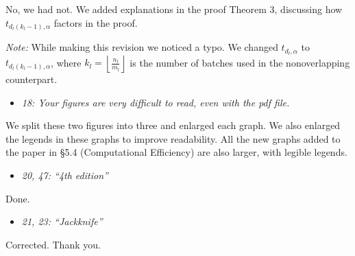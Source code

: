 \documentclass[11pt,notitlepage,onecolumn]{article}
\newcommand{\noi}{\noindent}
\begin{document}
\noi
No, we had not.   
We added explanations in the proof Theorem 3, discussing how $t_{d_l(k_l - 1),\alpha}$ factors in the proof. 
\medskip 

\noi 
{\it Note:}
While making this revision we noticed a typo. 
We changed $t_{d_l,\alpha}$ to $t_{d_l(k_l - 1),\alpha}$, where $k_l=\left\lfloor \frac{n_l}{m_l} \right\rfloor$ is the number of batches used in the nonoverlapping counterpart. 
\medskip 

\newpage
\begin{itemize}
\item[] \textit{18: Your figures are very difficult to read, even with the pdf file.}
\end{itemize}

\noi
We split these two figures into three and enlarged each graph. 
We also enlarged the legends in these graphs to improve readability.
All the new graphs added to the paper in \S 5.4 (Computational Efficiency) are also larger, with legible legends. 
\medskip 



\begin{itemize}
\item[] \textit{20, 47: ``4th edition''}
\end{itemize}

\noi
Done.
\medskip 



\begin{itemize}
\item[] \textit{21, 23: ``\it Jackknife''}
\end{itemize}

\noi
Corrected. Thank you. 
\end{document}
